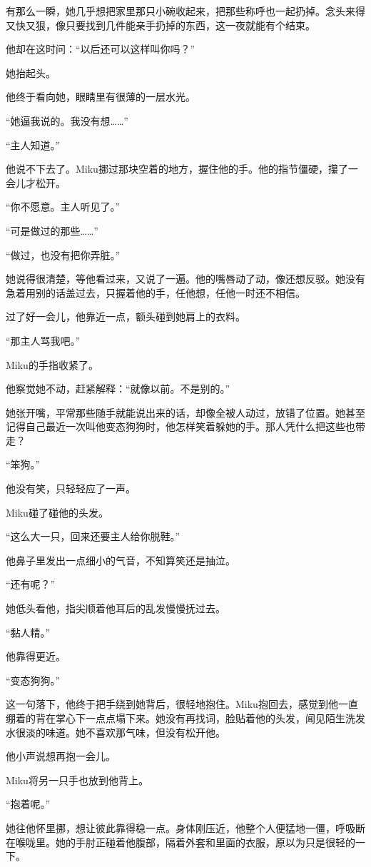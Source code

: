 有那么一瞬，她几乎想把家里那只小碗收起来，把那些称呼也一起扔掉。念头来得又快又狠，像只要找到几件能亲手扔掉的东西，这一夜就能有个结束。

他却在这时问：“以后还可以这样叫你吗？”

她抬起头。

他终于看向她，眼睛里有很薄的一层水光。

“她逼我说的。我没有想……”

“主人知道。”

他说不下去了。Miku挪过那块空着的地方，握住他的手。他的指节僵硬，攥了一会儿才松开。

“你不愿意。主人听见了。”

“可是做过的那些……”

“做过，也没有把你弄脏。”

她说得很清楚，等他看过来，又说了一遍。他的嘴唇动了动，像还想反驳。她没有急着用别的话盖过去，只握着他的手，任他想，任他一时还不相信。

过了好一会儿，他靠近一点，额头碰到她肩上的衣料。

“那主人骂我吧。”

Miku的手指收紧了。

他察觉她不动，赶紧解释：“就像以前。不是别的。”

她张开嘴，平常那些随手就能说出来的话，却像全被人动过，放错了位置。她甚至记得自己最近一次叫他变态狗狗时，他怎样笑着躲她的手。那人凭什么把这些也带走？

“笨狗。”

他没有笑，只轻轻应了一声。

Miku碰了碰他的头发。

“这么大一只，回来还要主人给你脱鞋。”

他鼻子里发出一点细小的气音，不知算笑还是抽泣。

“还有呢？”

她低头看他，指尖顺着他耳后的乱发慢慢抚过去。

“黏人精。”

他靠得更近。

“变态狗狗。”

这一句落下，他终于把手绕到她背后，很轻地抱住。Miku抱回去，感觉到他一直绷着的背在掌心下一点点塌下来。她没有再找词，脸贴着他的头发，闻见陌生洗发水很淡的味道。她不喜欢那气味，但没有松开他。

他小声说想再抱一会儿。

Miku将另一只手也放到他背上。

“抱着呢。”

她往他怀里挪，想让彼此靠得稳一点。身体刚压近，他整个人便猛地一僵，呼吸断在喉咙里。她的手肘正碰着他腹部，隔着外套和里面的衣服，原以为只是很轻的一下。

